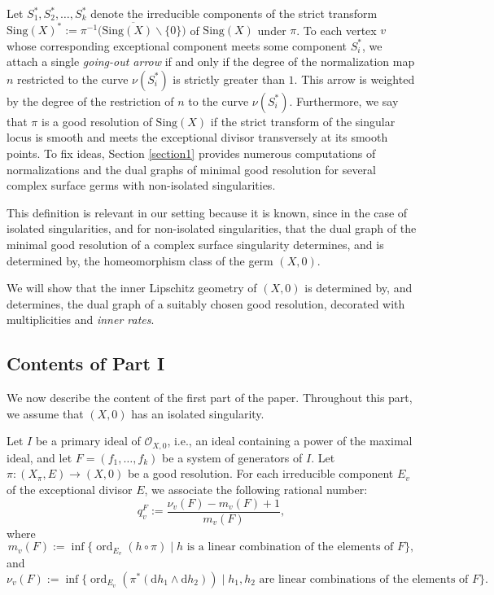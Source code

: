 \documentclass[reqno,dvipsnames,12pt]{amsart}
\renewcommand{\setminus}{\smallsetminus}
\begin{document}
Let \(S_1^*, S_2^*, \dots, S_k^*\) denote the irreducible components of the strict transform $\mathrm{Sing}(X)^* := \overline{\pi^{-1}\bigl(\mathrm{Sing}(X)\setminus\{0\}\bigr)}$
of \(\mathrm{Sing}(X)\) under \(\pi\).
To each vertex \(v\) whose corresponding exceptional component meets some component \(S_i^*\), we attach a single \emph{going-out arrow} if and only if the degree of the normalization map $n$ restricted to the curve \(\nu(S_i^*)\) is strictly greater than \(1\).
This arrow is weighted by the degree of the restriction of $n$ to the curve \(\nu(S_i^*)\). Furthermore, we say that $\pi$ is a good resolution of $\mathrm{Sing}(X)$ if the strict transform of the singular locus is smooth and meets the exceptional divisor transversely at its smooth points. To fix ideas, Section \ref{section1} provides numerous computations of normalizations and the dual graphs of  minimal good resolution for several complex surface germs with non-isolated singularities.


This definition is relevant in our setting because it is known, since \cite{Neu81} in the case of isolated singularities, and  \cite{luengopichon} for non-isolated singularities, that the dual graph of the minimal good resolution of a complex surface singularity determines, and is determined by, the homeomorphism class of the germ $(X,0)$.

 We will show that the inner Lipschitz geometry of $(X,0)$ is determined by, and determines, the dual graph of a suitably chosen good resolution, decorated with multiplicities and \textit{inner rates}.




 
\subsection*{Contents of Part I}

We now describe the content of the first part of the paper. Throughout this part, we assume that $(X,0)$ has an isolated singularity. 

Let $I$ be a primary ideal of $\mathcal{O}_{X,0}$, i.e., an ideal containing a power of the maximal ideal, and let $F=(f_1,\dots,f_k)$ be a system of generators of $I$. Let $\pi:(X_{\pi},E) \longrightarrow (X,0)$
be a good resolution. For each irreducible component $E_v$ of the exceptional divisor $E$, we associate the following rational number:
\[
q_v^{F} := \frac{\nu_v(F) - m_v(F) + 1}{m_v(F)},
\]
where
\[
m_v(F) := \inf \{ \operatorname{ord}_{E_v}(h \circ \pi) \mid h \text{ is a linear combination of the elements of } F \},
\]
and
\[
\nu_v(F) := \inf \{ \operatorname{ord}_{E_v}(\pi^*(\mathrm{d}h_1 \wedge \mathrm{d}h_2)) \mid h_1,h_2 \text{ are linear combinations of the elements of } F \}.
\]
\end{document}
